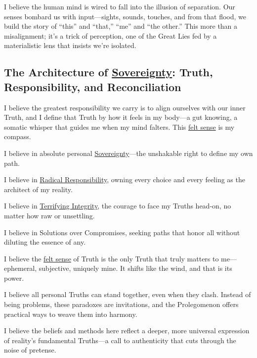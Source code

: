 \documentclass{article}
\begin{document}
I believe the human mind is wired to fall into the illusion of separation. Our senses bombard us with input—sights, sounds, touches, and from that flood, we build the story of “this” and “that,” “me” and “the other.” This more than a misalignment; it's a trick of perception, one of the Great Lies fed by a materialistic lens that insists we're isolated.

\subsection*{The Architecture of \hyperlink{gloss:sovereignty}{Sovereignty}: Truth, Responsibility, and Reconciliation}

I believe the greatest responsibility we carry is to align ourselves with our inner Truth, and I define that Truth by how it feels in my body—a gut knowing, a somatic whisper that guides me when my mind falters. This \hyperlink{gloss:felt_sense}{felt sense} is my compass.

I believe in absolute personal \hyperlink{gloss:sovereignty}{Sovereignty}—the unshakable right to define my own path.

I believe in \hyperlink{gloss:radical_responsibility}{Radical Responsibility}, owning every choice and every feeling as the architect of my reality.

I believe in \hyperlink{gloss:terrifying_integrity}{Terrifying Integrity}, the courage to face my Truths head-on, no matter how raw or unsettling.

I believe in Solutions over Compromises, seeking paths that honor all without diluting the essence of any.

I believe the \hyperlink{gloss:felt_sense}{felt sense} of Truth is the only Truth that truly matters to me—ephemeral, subjective, uniquely mine. It shifts like the wind, and that is its power.

I believe all personal Truths can stand together, even when they clash. Instead of being problems, these paradoxes are invitations, and the Prolegomenon offers practical ways to weave them into harmony.

I believe the beliefs and methods here reflect a deeper, more universal expression of reality's fundamental Truths—a call to authenticity that cuts through the noise of pretense.
\end{document}

